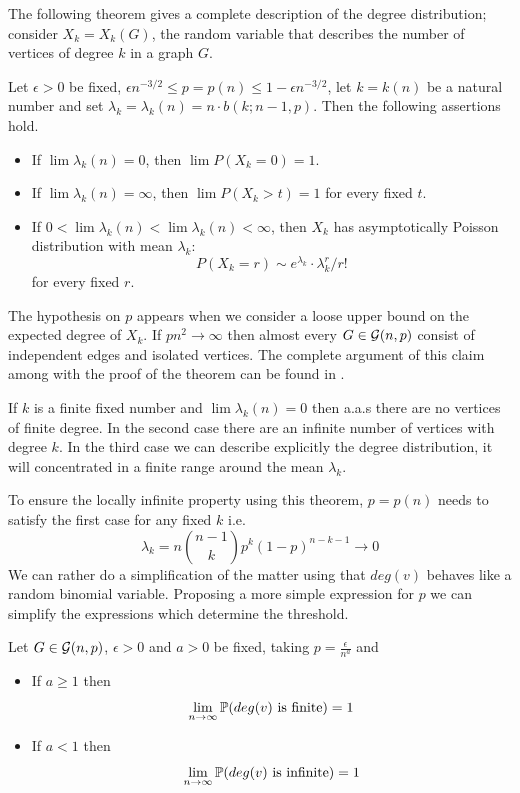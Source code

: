 The following theorem gives a complete description of the degree distribution; consider $X_{k} = X_{k} (G)$, the random variable that describes the number of vertices of degree $k$ in a graph $G$.

\begin{theorem}
Let $\epsilon>0$ be fixed, $\epsilon n^{-3/2} \leq p = p(n) \leq 1 - \epsilon n^{-3/2}$, let $k = k(n)$ be a natural number and set $\lambda_{k} = \lambda_{k}(n) = n\cdot b(k;n - 1,p)$. Then the following assertions hold.

\begin{itemize}
\item If $\lim \lambda_{k}(n) = 0$, then $\lim P(X_{k} = 0) = 1$. 
\item If $\lim \lambda_{k}(n) = \infty$, then $\lim P(X_{k} > t) = 1$
for every fixed $t$.
\item If $0 < \lim\lambda_{k}(n) < \lim \lambda_{k}(n) < \infty$,
then $X_{k}$ has asymptotically Poisson distribution with mean $\lambda_{k}$: 
$$P(X_{k} = r) \sim e^{\lambda_{k}}\cdot \lambda_{k}^{r}/ r!$$
for every fixed $r$.
\end{itemize}
\end{theorem}

The hypothesis on $p$ appears when we consider a loose upper bound on the expected degree of $X_ {k}$. If $pn^{2} \to \infty $ then almost every $ G \in \G (n, p) $ consist of independent edges and isolated vertices. The complete argument of this claim among with the proof of the theorem can be found in \cite[Bollobás, p.61]{Bollobas}.

If $k$ is a finite fixed number and $\lim \lambda_{k}(n) = 0$ then a.a.s there are no vertices of finite degree. In the second case there are an infinite number of vertices with degree $k$. In the third case we can describe explicitly the degree distribution, it will concentrated in a finite range around the mean $\lambda_{k}$. 

To ensure the locally infinite property using this theorem, $p = p(n)$ needs to satisfy the first case for any fixed $k$ i.e.
$$\lambda_{k} = n \binom{n-1}{k} p^{k} (1-p)^{n-k-1} \to 0$$
We can rather do a simplification of the matter using that $deg(v)$ behaves like a random binomial variable. Proposing a more simple expression for $p$ we can simplify the expressions which determine the threshold. 
\begin{theorem}\label{conectivityRCC}
Let $G \in \G(n,p)$, $\epsilon>0$ and $a>0$ be fixed, taking $p=\frac{\epsilon}{n^{a}}$ and 
\begin{itemize}
    \item If $a\geq 1$ then 
    $$\lim_{n \to \infty} \P(deg(v) \text{ is finite}) = 1$$
    \item If $a<1$ then
     $$\lim_{n \to \infty} \P(deg(v) \text{ is infinite}) = 1$$
\end{itemize}
\end{theorem}

